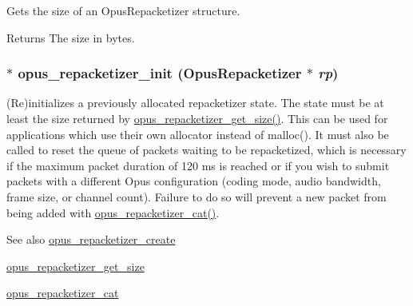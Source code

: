 Gets the size of an {\ttfamily OpusRepacketizer} structure. \begin{DoxyReturn}{Returns}
The size in bytes. 
\end{DoxyReturn}
\hypertarget{group__opus__repacketizer_gab42ff7c3f8a49ff5029fcf60f3b853f0}{
\subsubsection[{opus\_\-repacketizer\_\-init}]{$\ast$ opus\_\-repacketizer\_\-init ({\bf OpusRepacketizer} $\ast$ {\em rp})}}
\label{group__opus__repacketizer_gab42ff7c3f8a49ff5029fcf60f3b853f0}


(Re)initializes a previously allocated repacketizer state. The state must be at least the size returned by \hyperlink{group__opus__repacketizer_ga35c8fc05764748d187c62fc50e812d06}{opus\_\-repacketizer\_\-get\_\-size()}. This can be used for applications which use their own allocator instead of malloc(). It must also be called to reset the queue of packets waiting to be repacketized, which is necessary if the maximum packet duration of 120 ms is reached or if you wish to submit packets with a different Opus configuration (coding mode, audio bandwidth, frame size, or channel count). Failure to do so will prevent a new packet from being added with \hyperlink{group__opus__repacketizer_ga2840dd56bfa37f8c6874355b9ce8fb46}{opus\_\-repacketizer\_\-cat()}. \begin{DoxySeeAlso}{See also}
\hyperlink{group__opus__repacketizer_ga6f8813666ef851550ecf8658a731ff7d}{opus\_\-repacketizer\_\-create} 

\hyperlink{group__opus__repacketizer_ga35c8fc05764748d187c62fc50e812d06}{opus\_\-repacketizer\_\-get\_\-size} 

\hyperlink{group__opus__repacketizer_ga2840dd56bfa37f8c6874355b9ce8fb46}{opus\_\-repacketizer\_\-cat} 
\end{DoxySeeAlso}

